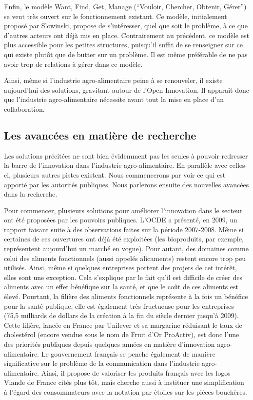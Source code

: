 \documentclass[a4paper,12pt]{report}
\begin{document}
			Enfin, le modèle Want, Find, Get, Manage (“Vouloir, Chercher, Obtenir, Gérer”) se veut très ouvert sur le fonctionnement existant. Ce modèle, initialement proposé par Slowinski\cite{WFGM}, propose de s’intéresser, quel que soit le problème, à ce que d’autres acteurs ont déjà mis en place. Contrairement au précédent, ce modèle est plus accessible pour les petites structures, puisqu’il suffit de se renseigner sur ce qui existe plutôt que de butter sur un problème. Il est même préférable de ne pas avoir trop de relations à gérer dans ce modèle.
			
			Ainsi, même si l’industrie agro-alimentaire peine à se renouveler, il existe aujourd’hui des solutions, gravitant autour de l’Open Innovation. Il apparaît donc que l’industrie agro-alimentaire nécessite avant tout la mise en place d’un collaboration.
			
		\subsection{Les avancées en matière de recherche}
			Les solutions précitées ne sont bien évidemment pas les seules à pouvoir redresser la barre de l’innovation dans l’industrie agro-alimentaire. En parallèle avec celles-ci, plusieurs autres pistes existent. Nous commencerons par voir ce qui est apporté par les autorités publiques. Nous parlerons ensuite des nouvelles avancées dans la recherche.
			
			Pour commencer, plusieurs solutions pour améliorer l’innovation dans le secteur ont été proposées par les pouvoirs publiques. L’OCDE a présenté, en 2009, un rapport \cite{OECD} faisant suite à des observations faites sur la période 2007-2008. Même si certaines de ces ouvertures ont déjà été exploitées (les bioproduits, par exemple, représentent aujourd’hui un marché en vogue). Pour autant, des domaines comme celui des aliments fonctionnels (aussi appelés alicaments) restent encore trop peu utilisés. Ainsi, même si quelques entreprises portent des projets de cet intérêt, elles sont une exception. Cela s’explique par le fait qu’il est difficile de créer des aliments avec un effet bénéfique sur la santé, et que le coût de ces aliments est élevé. Pourtant, la filière des aliments fonctionnels représente à la fois un bénéfice pour la santé publique, elle est également très fructueuse pour les entreprises (75,5 milliards de dollars de la création à la fin du siècle dernier jusqu’à 2009). Cette filière, lancée en France par Unilever et sa margarine réduisant le taux de cholestérol (encore vendue sous le nom de Fruit d’Or ProActiv)\cite{FruitDOr}, est donc l’une des priorités publiques depuis quelques années en matière d’innovation agro-alimentaire. Le gouvernement français se penche également de manière significative sur le problème de la communication dans l’industrie agro-alimentaire. Ainsi, il propose de valoriser les produits français avec les logos Viande de France cités plus tôt, mais cherche aussi à instituer une simplification à l’égard des consommateurs avec la notation par étoiles sur les pièces bouchères\cite{EtoilesViande}. 
\end{document}
